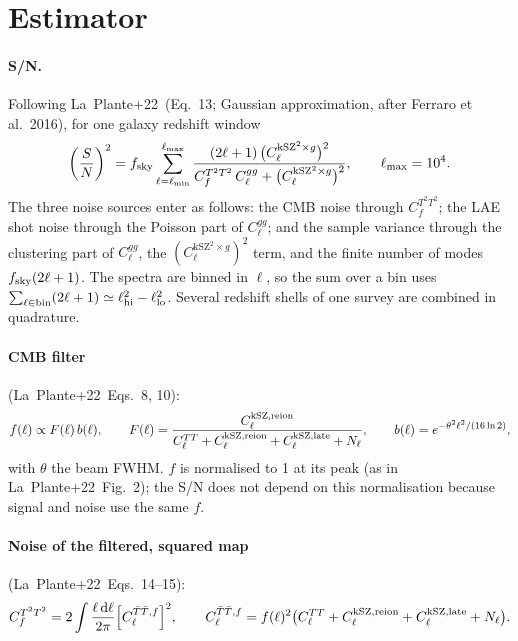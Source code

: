 \documentclass[11pt]{article}
\newcommand{\kSZ}{\mathrm{kSZ}}
\newcommand{\LP}{La~Plante+22}
\begin{document}
\section{Estimator}\label{sec:estimator}
\paragraph{S/N.} Following \LP\ (Eq.~13; Gaussian approximation, after Ferraro et al.\ 2016), for one galaxy redshift window
\begin{equation}
\left(\frac{S}{N}\right)^2 = f_{\rm sky}\sum_{\ell=\ell_{\min}}^{\ell_{\max}} \frac{(2\ell+1)\,\bigl(C_\ell^{\kSZ^2\times g}\bigr)^2}{C^{T^2T^2}_{f}\,C_\ell^{gg} + \bigl(C_\ell^{\kSZ^2\times g}\bigr)^2},
\qquad \ell_{\max}=10^4 .
\label{eq:snr}
\end{equation}
The three noise sources enter as follows: the CMB noise through $C^{T^2T^2}_f$; the LAE shot noise through the Poisson part of $C^{gg}_\ell$; and the sample variance through the clustering part of $C^{gg}_\ell$, the $(C_\ell^{\kSZ^2\times g})^2$ term, and the finite number of modes $f_{\rm sky}(2\ell+1)$.
The spectra are binned in $\ell$, so the sum over a bin uses $\sum_{\ell\in{\rm bin}}(2\ell+1)\simeq \ell_{\rm hi}^2-\ell_{\rm lo}^2$. Several redshift shells of one survey are combined in quadrature.

\paragraph{CMB filter} (\LP\ Eqs.~8, 10):
\begin{equation}
f(\ell) \propto F(\ell)\,b(\ell),\qquad
F(\ell)=\frac{C_\ell^{\kSZ,{\rm reion}}}{C_\ell^{TT}+C_\ell^{\kSZ,{\rm reion}}+C_\ell^{\kSZ,{\rm late}}+N_\ell},\qquad
b(\ell)=e^{-\theta^2\ell^2/(16\ln2)},
\end{equation}
with $\theta$ the beam FWHM. $f$ is normalised to 1 at its peak (as in \LP\ Fig.~2); the S/N does not depend on this normalisation because signal and noise use the same $f$.

\paragraph{Noise of the filtered, squared map} (\LP\ Eqs.~14--15):
\begin{equation}
C^{T^2T^2}_f = 2\int\frac{\ell\,{\rm d}\ell}{2\pi}\Bigl[C^{\bar T\bar T,f}_\ell\Bigr]^2,\qquad
C^{\bar T\bar T,f}_\ell = f(\ell)^2\bigl(C_\ell^{TT}+C_\ell^{\kSZ,{\rm reion}}+C_\ell^{\kSZ,{\rm late}}+N_\ell\bigr).
\end{equation}
\end{document}
